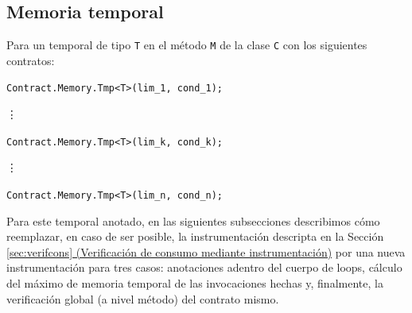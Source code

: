 \documentclass[12pt,a4paper]{article}
\newcommand\mono[1]{\texttt{#1}}
\begin{document}
		\subsection{Memoria temporal}
			Para un temporal de tipo \mono{T} en el método \mono{M} de la clase \mono{C} con los siguientes contratos:

			\mono{Contract.Memory.Tmp<T>(lim\_1, cond\_1);}

			\hspace{15pt}\vdots

			\mono{Contract.Memory.Tmp<T>(lim\_k, cond\_k);}

			\hspace{15pt}\vdots

			\mono{Contract.Memory.Tmp<T>(lim\_n, cond\_n);}

			Para este temporal anotado, en las siguientes subsecciones describimos cómo reemplazar, en caso de ser posible, la instrumentación descripta en la Sección \hyperref[sec:verifcons]{\ref*{sec:verifcons} (Verificación de consumo mediante instrumentación)} por una nueva instrumentación para tres casos: anotaciones adentro del cuerpo de loops, cálculo del máximo de memoria temporal de las invocaciones hechas y, finalmente, la verificación global (a nivel método) del contrato mismo.
\end{document}
